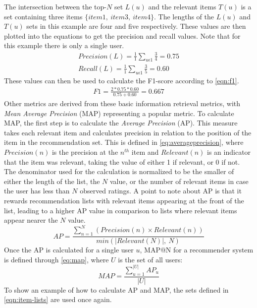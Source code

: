 The intersection between the top-$N$ set $L(u)$ and the relevant items $T(u)$ is a set containing three items $\{item1, \: item3, \: item4\}$.
The lengths of the $L(u)$ and $T(u)$ sets in this example are four and five respectively.
These values are then plotted into the equations to get the precision and recall values.
Note that for this example there is only a single user.
\begin{align*}
    Precision(L) = \frac{1}{1} \sum\limits_{u \epsilon 1}\frac{3}{4} = 0.75\\
    Recall(L) = \frac{1}{1} \sum\limits_{u \epsilon 1} \frac{3}{5} = 0.60
\end{align*}
These values can then be used to calculate the F1-score according to \autoref{eqn:f1}.
\begin{align*}
    F1 = \frac{2*0.75*0.60}{0.75+0.60} = 0.667
\end{align*}
Other metrics are derived from these basic information retrieval metrics, with \textit{Mean Average Precision} (MAP) representing a popular metric\cite{ChoosingMetricsEvaluation}.
To calculate MAP, the first step is to calculate the \textit{Average Precision} (AP).
This measure takes each relevant item and calculates precision in relation to the position of the item in the recommendation set.
This is defined in \autoref{eq:averageprecision}, where $Precision(n)$ is the precision at the $n^{th}$ item and $Relevant(n)$ is an indicator that the item was relevant, taking the value of either 1 if relevant, or 0 if not.
The denominator used for the calculation is normalized to be the smaller of either the length of the list, the $N$ value, or the number of relevant items in case the user has less than $N$ observed ratings.
A point to note about AP is that it rewards recommendation lists with relevant items appearing at the front of the list, leading to a higher AP value in comparison to lists where relevant items appear nearer the $N$ value. 
\begin{equation}
    \label{eq:averageprecision}
    AP = \frac{\sum\limits_{n=1}^N (Precision(n) \times Relevant(n))}{min(|Relevant(N)|,\:N)}
\end{equation}
Once the AP is calculated for a single user $u$, MAP@N for a recommender system is defined through \autoref{eq:map}, where $U$ is the set of all users: 
\begin{equation}
    \label{eq:map}
    MAP = \frac{\sum\limits_{u=1}^{|U|} AP_u}{|U|}
\end{equation}
To show an example of how to calculate AP and MAP, the sets defined in \autoref{eqn:item-lists} are used once again.
